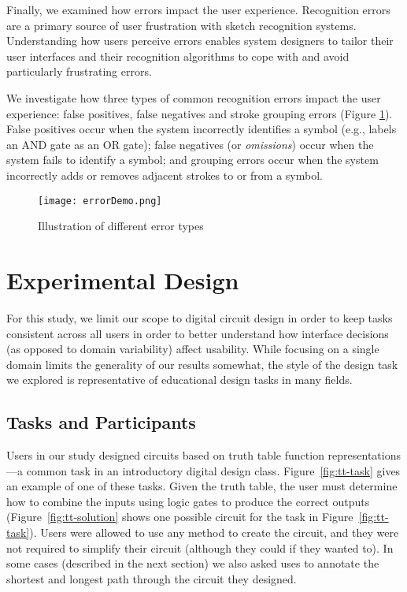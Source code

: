 \documentclass{egpubl}
\begin{document}
Finally, we examined how errors impact the user experience.
Recognition errors are a primary source of user frustration with
sketch recognition systems.  Understanding how users perceive errors
enables system designers to tailor their user interfaces and their
recognition algorithms to cope with and avoid particularly frustrating
errors.


We investigate how three types of common recognition errors impact the
user experience: false positives, false negatives and stroke grouping
errors (Figure \ref{fig:errorDemo}).  False positives occur when the
system incorrectly identifies a symbol (e.g., labels an AND gate as an
OR gate); false negatives (or \textit{omissions}) occur when the
system fails to identify a symbol; and grouping errors occur when the
system incorrectly adds or removes adjacent strokes to or from a
symbol.


\begin{figure}[tb]
  \centering
  \texttt{[image: errorDemo.png]}
  \caption{\label{fig:errorDemo}
           Illustration of different error types}
\end{figure}

\section{Experimental Design}
For this study, we limit our scope to digital circuit design in order
to keep tasks consistent across all users in order to better
understand how interface decisions (as opposed to domain variability)
affect usability.  While focusing on a single domain limits the
generality of our results somewhat, the style of the design task we
explored is representative of educational design tasks in many fields.

\subsection{Tasks and Participants}
Users in our study designed circuits based on truth table function
representations---a common task in an introductory digital design
class.  Figure~\ref{fig:tt-task} gives an example of one of these
tasks.  Given the truth table, the user must determine how to combine
the inputs using logic gates to produce the correct outputs
(Figure~\ref{fig:tt-solution} shows one possible circuit for the task in
Figure~\ref{fig:tt-task}).  Users were allowed to use any method to
create the circuit, and they were not required to simplify their
circuit (although they could if they wanted to).  In some cases
(described in the next section) we also asked uses to annotate the
shortest and longest path through the circuit they designed.
\end{document}
